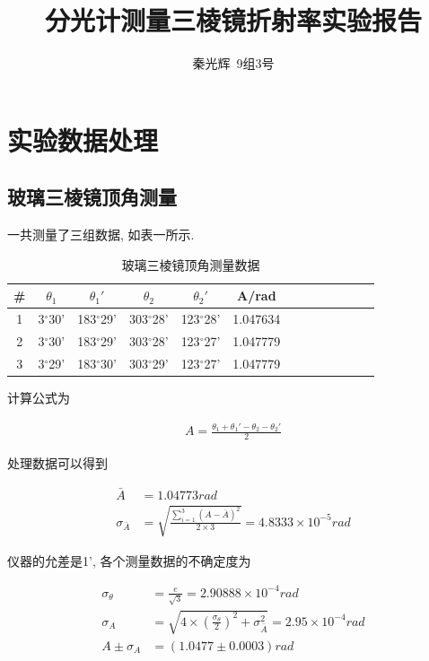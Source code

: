 \documentclass[a4paper,12pt,notitlepage]{article}
\begin{document}
\title{分光计测量三棱镜折射率实验报告}
\author{秦光辉\ 9组3号}
\maketitle

\section{实验数据处理}

\subsection{玻璃三棱镜顶角测量}

	一共测量了三组数据, 如表一所示. 
	
\begin{center}
	\begin{longtable}{|c|c|c|c|c|c|c|c|c|c|c|c|c|}

	\caption{玻璃三棱镜顶角测量数据}	\\
	\hline
	\# & $\theta_1$ & $\theta_1'$ & $\theta_2$ & $\theta_2'$ & A/rad \\
	\hline
	1 & 3$^\circ$30' & 183$^\circ$29' & 303$^\circ$28' & 123$^\circ$28' & 1.047634 \\
	\hline
	2 & 3$^\circ$30' & 183$^\circ$29' & 303$^\circ$28' & 123$^\circ$27' & 1.047779 \\
	\hline
	3 & 3$^\circ$29' & 183$^\circ$30' & 303$^\circ$29' & 123$^\circ$27' & 1.047779 \\
	\hline
	
	\end{longtable}
\end{center}

	计算公式为
	
\begin{align*}
	A = \frac{\theta_1 + \theta_1' - \theta_2 - \theta_2'}{2}
\end{align*}

	处理数据可以得到
	
\begin{align*}
	\bar{A} &= 1.04773 rad \\
	\sigma_{\bar{A}} &= \sqrt{\frac{\sum_{i = 1}^3(A - \bar{A})^2}{2 \times 3}} = 4.8333 \times 10^{-5} rad
\end{align*}

	仪器的允差是1', 各个测量数据的不确定度为
	
\begin{align*}
	\sigma_{\theta} &= \frac{e}{\sqrt{3}} = 2.90888 \times 10^{-4} rad \\
	\sigma_A &= \sqrt{4 \times (\frac{\sigma_{\theta}}{2})^2 + \sigma_{\bar{A}}^2} = 2.95 \times 10 ^ {-4} rad \\
	A \pm \sigma_A &= (1.0477 \pm 0.0003) rad
\end{align*}
\end{document}
